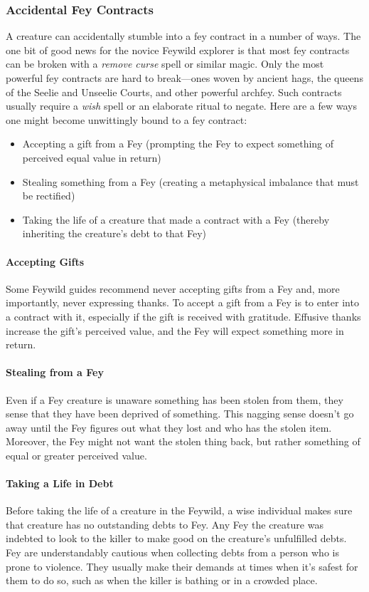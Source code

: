 \documentclass[10pt,a4paper,twoside,twocolumn,openany,nodeprecatedcode,bg=print]{dndbook}
\begin{document}
\subsubsection{Accidental Fey Contracts}
A creature can accidentally stumble into a fey contract in a number of ways. The one bit of good news for the novice Feywild explorer is that most fey contracts can be broken with a \textit{remove curse} spell or similar magic. Only the most powerful fey contracts are hard to break—ones woven by ancient hags, the queens of the Seelie and Unseelie Courts, and other powerful archfey. Such contracts usually require a \textit{wish} spell or an elaborate ritual to negate.
Here are a few ways one might become unwittingly bound to a fey contract:
\begin{itemize}

\item Accepting a gift from a Fey (prompting the Fey to expect something of perceived equal value in return)
\item Stealing something from a Fey (creating a metaphysical imbalance that must be rectified)
\item Taking the life of a creature that made a contract with a Fey (thereby inheriting the creature's debt to that Fey)
\end{itemize}


\paragraph{Accepting Gifts}
Some Feywild guides recommend never accepting gifts from a Fey and, more importantly, never expressing thanks.
To accept a gift from a Fey is to enter into a contract with it, especially if the gift is received with gratitude. Effusive thanks increase the gift's perceived value, and the Fey will expect something more in return.
\paragraph{Stealing from a Fey}
Even if a Fey creature is unaware something has been stolen from them, they sense that they have been deprived of something. This nagging sense doesn't go away until the Fey figures out what they lost and who has the stolen item. Moreover, the Fey might not want the stolen thing back, but rather something of equal or greater perceived value.
\paragraph{Taking a Life in Debt}
Before taking the life of a creature in the Feywild, a wise individual makes sure that creature has no outstanding debts to Fey. Any Fey the creature was indebted to look to the killer to make good on the creature's unfulfilled debts.
Fey are understandably cautious when collecting debts from a person who is prone to violence. They usually make their demands at times when it's safest for them to do so, such as when the killer is bathing or in a crowded place.
\end{document}
